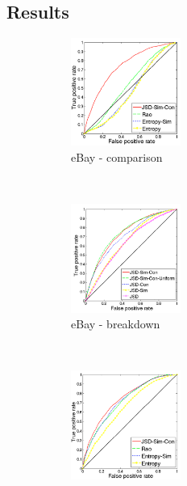 \documentclass{article} %
\begin{document}
\subsection{Results}
\label{sec:results}
\begin{figure}
        \centering
        \begin{subfigure}[b]{0.24\textwidth}
                \centering
                \includegraphics[width=36mm]{figures/phonecases-comparison-kopia.png}
               \caption{eBay - comparison}
                \label{fig:phonecases-comparison}
        \end{subfigure}%
              ~ %
        \begin{subfigure}[b]{0.24\textwidth}
                \centering
                \includegraphics[width=36mm]{figures/phonecases-breakdown-kopia.png}
                \caption{eBay - breakdown}
                \label{fig:phonecases-breakdown}
        \end{subfigure}\nobreak
              ~ %
        \begin{subfigure}[b]{0.24\textwidth}
                \centering
                \includegraphics[width=36mm]{figures/nsf-comparison-kopia.png}

\end{subfigure}
\end{figure}
\end{document}
